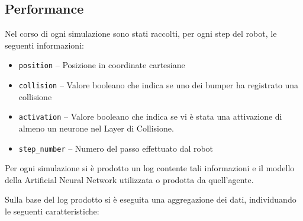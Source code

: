 \subsection{Performance}


Nel corso di ogni simulazione sono stati raccolti, per ogni step del robot, le seguenti informazioni:

\begin{itemize}
    \item \texttt{position} -- Posizione in coordinate cartesiane
    \item \texttt{collision} -- Valore booleano che indica se uno dei bumper ha registrato una collisione
    \item \texttt{activation} -- Valore booleano che indica se vi è stata una attivazione di almeno un neurone nel Layer di Collisione.
    \item \texttt{step\_number} -- Numero del passo effettuato dal robot
\end{itemize}

Per ogni simulazione si è prodotto un log contente tali informazioni e il modello della Artificial Neural Network utilizzata o prodotta da quell'agente.


Sulla base del log prodotto si è eseguita una aggregazione dei dati, individuando le seguenti caratteristiche:

